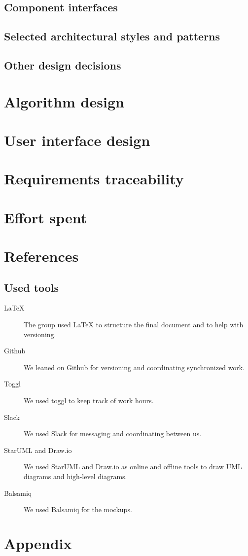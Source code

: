 \documentclass[12pt, a4paper]{article}
\begin{document}
		\subsection{Component interfaces}
		\label{sec:components_interfaces}
			

		\subsection{Selected  architectural  styles  and  patterns}

		\subsection{Other design decisions}

	\newpage
	\section{Algorithm design}
	\label{sec:algorithm_design}
		

	\newpage
	\section{User interface design}
	\label{sec:user_interface_design}
		

	\newpage
	\section{Requirements traceability}
		

	\newpage
	\section{Effort spent}

	\newpage
	\section{References}
		\subsection{Used tools}
		\begin{description}
			\item [LaTeX] The group used LaTeX to structure the final document and to help with versioning.
			\item [Github] We leaned on Github for versioning and coordinating synchronized work.
			\item [Toggl] We used toggl to keep track of work hours.
			\item [Slack] We used Slack for messaging and coordinating between us.
			\item [StarUML and Draw.io] We used StarUML and Draw.io as online and offline tools to draw UML diagrams and high-level diagrams.
			\item [Balsamiq] We used Balsamiq for the mockups.
		\end{description}

	\newpage
	\section{Appendix}
	\listoffigures
	\listoftables
\end{document}
